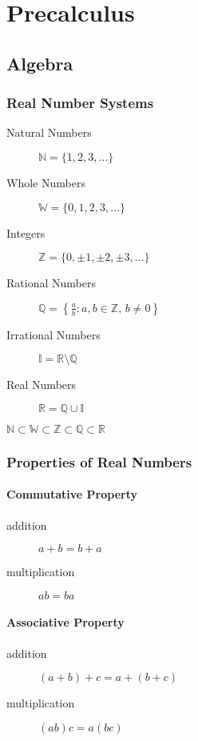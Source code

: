 \part{Precalculus}

\chapter{Algebra}

\section{Real Number Systems}
\begin{description}
    \item[Natural Numbers] $\mathbb{N} = \{1,2,3,\dots\}$
    \item[Whole Numbers] $\mathbb{W} = \{0,1,2,3,\dots\}$
    \item[Integers] $\mathbb{Z} = \{0,\pm1,\pm2,\pm3,\dots\}$
    \item[Rational Numbers] $\mathbb{Q} = \left\{\frac{a}{b} : a,b \in \mathbb{Z},\, b \neq 0 \right\}$
    \item[Irrational Numbers] $\mathbb{I} = \mathbb{R} \setminus \mathbb{Q}$
    \item[Real Numbers] $\mathbb{R} = \mathbb{Q} \cup \mathbb{I}$
\end{description}

$\mathbb{N} \subset \mathbb{W} \subset \mathbb{Z} \subset \mathbb{Q} \subset \mathbb{R}$

\section{Properties of Real Numbers}

\subsection{Commutative Property}
\begin{description}
    \item[addition] $a + b = b + a$
    \item[multiplication] $ab = ba$
\end{description}

\subsection{Associative Property}
\begin{description}
    \item[addition] $(a + b) + c = a + (b + c)$
    \item[multiplication] $(ab)c = a(bc)$
\end{description}

